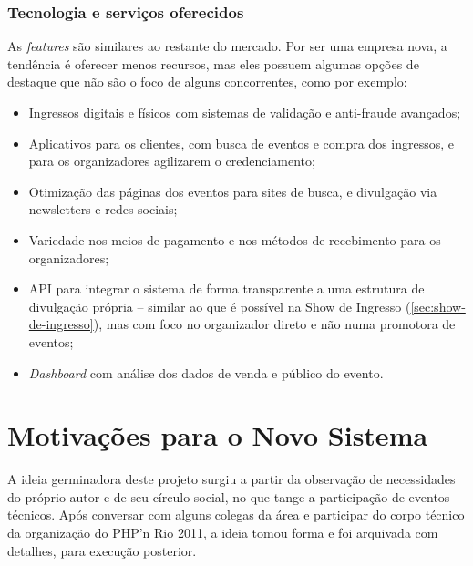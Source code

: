 \documentclass[12pt,a4paper,twoside,hyphens,english,brazil]{abntex2}
\begin{document}
\subsubsection*{Tecnologia e serviços oferecidos}
As \emph{features} são similares ao restante do mercado. Por ser uma empresa nova, a tendência é oferecer menos recursos, mas eles possuem algumas opções de destaque que não são o foco de alguns concorrentes, como por exemplo:
\begin{itemize}[itemsep=-1ex]
	\item Ingressos digitais e físicos com sistemas de validação e anti-fraude avançados;
	\item Aplicativos para os clientes, com busca de eventos e compra dos ingressos, e para os organizadores agilizarem o credenciamento;
	\item Otimização das páginas dos eventos para sites de busca, e divulgação via newsletters e redes sociais;
	\item Variedade nos meios de pagamento e nos métodos de recebimento para os organizadores;
	\item API para integrar o sistema de forma transparente a uma estrutura de divulgação própria -- similar ao que é possível na Show de Ingresso (\autoref{sec:show-de-ingresso}), mas com foco no organizador direto e não numa promotora de eventos;
	\item \emph{Dashboard} com análise dos dados de venda e público do evento.
\end{itemize}




\section{Motivações para o Novo Sistema}
A ideia germinadora deste projeto surgiu a partir da observação de necessidades do próprio autor e de seu círculo social, no que tange a participação de eventos técnicos. Após conversar com alguns colegas da área e participar do corpo técnico da organização do PHP'n Rio 2011, a ideia tomou forma e foi arquivada com detalhes, para execução posterior.
\end{document}
